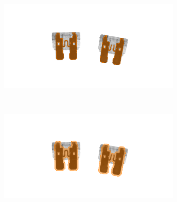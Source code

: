 \begin{figure}
    \begin{subfigure}[b]{\basicWidth}
            \centering
            \includegraphics[width=\linewidth]{BlobAnalysis/img/fuses_region}
            \caption{}
    \end{subfigure}%
    ~
    \begin{subfigure}[b]{\basicWidth}
            \centering
            \includegraphics[width=\linewidth]{BlobAnalysis/img/fuses_dilated}
            \caption{}
    \end{subfigure}


\end{figure}
